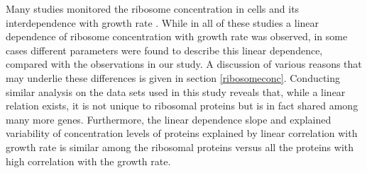 Many studies monitored the ribosome concentration in cells and its interdependence with growth rate \cite{Scott2010,Schaechter1958,Bremer,Zaslaver2009,Bremer1987}.
While in all of these studies a linear dependence of ribosome concentration with growth rate was observed, in some cases different parameters were found to describe this linear dependence, compared with the observations in our study.
A discussion of various reasons that may underlie these differences is given in section \ref{ribosomeconc}.
Conducting similar analysis on the data sets used in this study reveals that, while a linear relation exists, it is not unique to ribosomal proteins but is in fact shared among many more genes.
Furthermore, the linear dependence slope and explained variability of concentration levels of proteins explained by linear correlation with growth rate is similar among the ribosomal proteins versus all the proteins with high correlation with the growth rate.